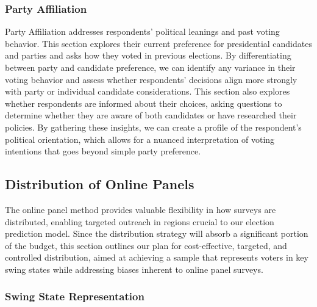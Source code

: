 \documentclass[
  letterpaper,
  DIV=11,
  numbers=noendperiod]{scrartcl}
\begin{document}
\hypertarget{party-affiliation}{%
\subsubsection{Party Affiliation}\label{party-affiliation}}

Party Affiliation addresses respondents' political leanings and past
voting behavior. This section explores their current preference for
presidential candidates and parties and asks how they voted in previous
elections. By differentiating between party and candidate preference, we
can identify any variance in their voting behavior and assess whether
respondents' decisions align more strongly with party or individual
candidate considerations. This section also explores whether respondents
are informed about their choices, asking questions to determine whether
they are aware of both candidates or have researched their policies. By
gathering these insights, we can create a profile of the respondent's
political orientation, which allows for a nuanced interpretation of
voting intentions that goes beyond simple party preference.

\hypertarget{distribution-of-online-panels}{%
\subsection{Distribution of Online
Panels}\label{distribution-of-online-panels}}

The online panel method provides valuable flexibility in how surveys are
distributed, enabling targeted outreach in regions crucial to our
election prediction model. Since the distribution strategy will absorb a
significant portion of the budget, this section outlines our plan for
cost-effective, targeted, and controlled distribution, aimed at
achieving a sample that represents voters in key swing states while
addressing biases inherent to online panel surveys.

\hypertarget{swing-state-representation}{%
\subsubsection{Swing State
Representation}\label{swing-state-representation}}
\end{document}
